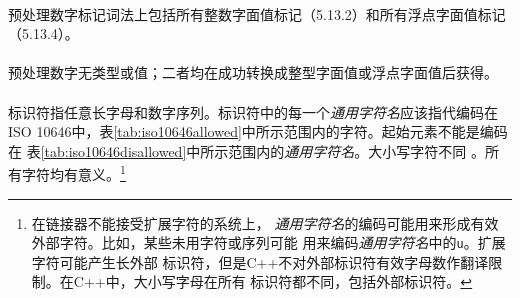 \paragraph{}
预处理数字标记词法上包括所有整数字面值标记（5.13.2）和所有浮点字面值标记
（5.13.4）。

\paragraph{}
预处理数字无类型或值；二者均在成功转换成整型字面值或浮点字面值后获得。


\paragraph{}
标识符指任意长字母和数字序列。标识符中的每一个\textit{通用字符名}应该指代编码在
ISO 10646中，表\ref{tab:iso10646allowed}中所示范围内的字符。起始元素不能是编码在
表\ref{tab:iso10646disallowed}中所示范围内的\textit{通用字符名}。大小写字符不同
。所有字符均有意义。\footnote{在链接器不能接受扩展字符的系统上，
\textit{通用字符名}的编码可能用来形成有效外部字符。比如，某些未用字符或序列可能
用来编码\textit{通用字符名}中的\texttt{\bslh u}。扩展字符可能产生长外部
标识符，但是C++不对外部标识符有效字母数作翻译限制。在C++中，大小写字母在所有
标识符都不同，包括外部标识符。}

